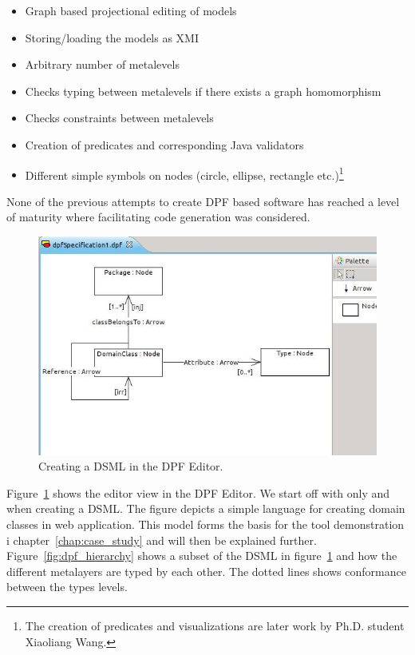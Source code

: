 \begin{itemize}
  \item Graph based projectional editing of models
  \item Storing/loading the models as XMI
  \item Arbitrary number of metalevels
  \item Checks typing between metalevels if there exists a graph homomorphism
  \item Checks constraints between metalevels
  \item Creation of predicates and corresponding Java validators
  \item Different simple symbols on nodes (circle, ellipse, rectangle etc.)\footnote{The creation of predicates and visualizations are later work by Ph.D. student Xiaoliang Wang.}
\end{itemize}

None of the previous attempts to create DPF based software has reached a level of maturity where facilitating code generation was considered. 

\begin{figure}[htpb]
  \centering
  \centerline{\includegraphics[scale=0.6]{images/dpf_editor.jpeg}}
  \caption[DPF Editor]{Creating a DSML in the DPF Editor.}
  \label{fig:dpf_editor}
\end{figure}

Figure~\ref{fig:dpf_editor} shows the editor view in the DPF Editor. We start off with only  and  when creating a DSML. The figure depicts a simple language for creating domain classes in web application. This model forms the basis for the tool demonstration i chapter~\ref{chap:case_study} and will then be explained further. Figure~\ref{fig:dpf_hierarchy} shows a subset of the DSML in figure~\ref{fig:dpf_editor} and how the different metalayers are typed by each other. The dotted lines shows conformance between the types levels.

